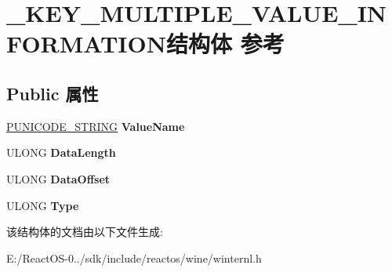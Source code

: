 \hypertarget{struct___k_e_y___m_u_l_t_i_p_l_e___v_a_l_u_e___i_n_f_o_r_m_a_t_i_o_n}{}\section{\+\_\+\+K\+E\+Y\+\_\+\+M\+U\+L\+T\+I\+P\+L\+E\+\_\+\+V\+A\+L\+U\+E\+\_\+\+I\+N\+F\+O\+R\+M\+A\+T\+I\+O\+N结构体 参考}
\label{struct___k_e_y___m_u_l_t_i_p_l_e___v_a_l_u_e___i_n_f_o_r_m_a_t_i_o_n}
\subsection*{Public 属性}
\begin{DoxyCompactItemize}
\item 
\mbox{\label{struct___k_e_y___m_u_l_t_i_p_l_e___v_a_l_u_e___i_n_f_o_r_m_a_t_i_o_n_ad1bb6c3f2f997fa18791296baa2c72fe}} 
\hyperlink{struct___u_n_i_c_o_d_e___s_t_r_i_n_g}{P\+U\+N\+I\+C\+O\+D\+E\+\_\+\+S\+T\+R\+I\+NG} {\bfseries Value\+Name}
\item 
\mbox{\label{struct___k_e_y___m_u_l_t_i_p_l_e___v_a_l_u_e___i_n_f_o_r_m_a_t_i_o_n_a0456115f5b8d7ffd3e592657159e5b04}} 
U\+L\+O\+NG {\bfseries Data\+Length}
\item 
\mbox{\label{struct___k_e_y___m_u_l_t_i_p_l_e___v_a_l_u_e___i_n_f_o_r_m_a_t_i_o_n_a2003f2540a7bee581530a0164aecc2c0}} 
U\+L\+O\+NG {\bfseries Data\+Offset}
\item 
\mbox{\label{struct___k_e_y___m_u_l_t_i_p_l_e___v_a_l_u_e___i_n_f_o_r_m_a_t_i_o_n_a9854817a4e6444478af0d5e9ff9ad81e}} 
U\+L\+O\+NG {\bfseries Type}
\end{DoxyCompactItemize}


该结构体的文档由以下文件生成\+:\begin{DoxyCompactItemize}
\item 
E\+:/\+React\+O\+S-\/0../sdk/include/reactos/wine/winternl.\+h\end{DoxyCompactItemize}
